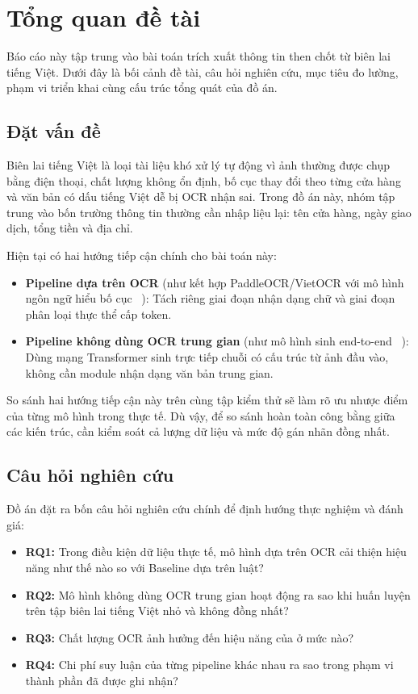 
\section{Tổng quan đề tài}
\label{sec:introduction}

Báo cáo này tập trung vào bài toán trích xuất thông tin then chốt từ biên lai tiếng Việt. Dưới đây là bối cảnh đề tài, câu hỏi nghiên cứu, mục tiêu đo lường, phạm vi triển khai cùng cấu trúc tổng quát của đồ án.

\subsection{Đặt vấn đề}
\label{subsec:problem-statement}

Biên lai tiếng Việt là loại tài liệu khó xử lý tự động vì ảnh thường được chụp bằng điện thoại, chất lượng không ổn định, bố cục thay đổi theo từng cửa hàng và văn bản có dấu tiếng Việt dễ bị OCR nhận sai. Trong đồ án này, nhóm tập trung vào bốn trường thông tin thường cần nhập liệu lại: tên cửa hàng, ngày giao dịch, tổng tiền và địa chỉ.

Hiện tại có hai hướng tiếp cận chính cho bài toán này:
\begin{itemize}
  \item \textbf{Pipeline dựa trên OCR} (như kết hợp PaddleOCR/VietOCR với mô hình ngôn ngữ hiểu bố cục ~\cite{xu2021layoutxlm}): Tách riêng giai đoạn nhận dạng chữ và giai đoạn phân loại thực thể cấp token.
  \item \textbf{Pipeline không dùng OCR trung gian} (như mô hình sinh end-to-end ~\cite{kim2022donut}): Dùng mạng Transformer sinh trực tiếp chuỗi có cấu trúc từ ảnh đầu vào, không cần module nhận dạng văn bản trung gian.
\end{itemize}

So sánh hai hướng tiếp cận này trên cùng tập kiểm thử sẽ làm rõ ưu nhược điểm của từng mô hình trong thực tế. Dù vậy, để so sánh hoàn toàn công bằng giữa các kiến trúc, cần kiểm soát cả lượng dữ liệu và mức độ gán nhãn đồng nhất.

\subsection{Câu hỏi nghiên cứu}
\label{subsec:research-questions}

Đồ án đặt ra bốn câu hỏi nghiên cứu chính để định hướng thực nghiệm và đánh giá:
\begin{itemize}
  \item \textbf{RQ1:} Trong điều kiện dữ liệu thực tế, mô hình dựa trên OCR  cải thiện hiệu năng như thế nào so với Baseline dựa trên luật?
  \item \textbf{RQ2:} Mô hình không dùng OCR trung gian  hoạt động ra sao khi huấn luyện trên tập biên lai tiếng Việt nhỏ và không đồng nhất?
  \item \textbf{RQ3:} Chất lượng OCR ảnh hưởng đến hiệu năng của  ở mức nào?
  \item \textbf{RQ4:} Chi phí suy luận của từng pipeline khác nhau ra sao trong phạm vi thành phần đã được ghi nhận?
\end{itemize}


